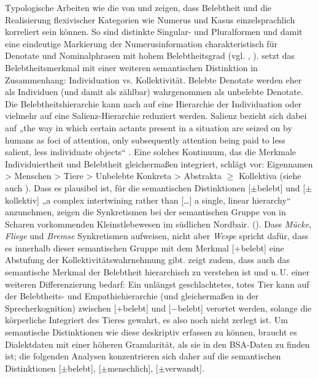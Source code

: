 Typologische Arbeiten wie die von \citet{Comrie1981} und \citet{Corbett2000} zeigen, dass Belebtheit und die Realisierung flexivischer Kategorien wie Numerus und Kasus einzelsprachlich korreliert sein können. So sind distinkte Singular- und Pluralformen und damit eine eindeutige Markierung der Numerusinformation charakteristisch für Denotate und Nominalphrasen mit hohem Belebtheitsgrad (vgl. \citealt[180]{Comrie1981}, \citealt[56]{Corbett2000}). \citet[181--182]{Comrie1981} setzt das Belebtheitsmerkmal mit einer weiteren semantischen Distinktion in Zusammenhang: Individuation vs. Kollektivität. Belebte Denotate werden eher als Individuen (und damit als zählbar) wahrgenommen als unbelebte Denotate. Die Belebtheitshierarchie kann nach \citet[192]{Comrie1981} auf eine Hierarchie der Individuation oder vielmehr auf eine Salienz-Hierarchie reduziert werden. Salienz bezieht sich dabei auf „the way in which certain actants present in a situation are seized on by humans as foci of attention, only subsequently attention being paid to less salient, less individuate objects“ \citep[192]{Comrie1981}. Eine solches Kontinuum, das die Merkmale Individuiertheit und Belebtheit gleichermaßen integriert, schlägt \citet[180]{Sasse2015} vor: Eigennamen > Menschen > Tiere > Unbelebte Konkreta > Abstrakta ${\geq}$ Kollektiva (siehe auch \citealt[659]{Sasse1993}). Dass es plausibel ist, für die semantischen Distinktionen [${\pm}$belebt] und [${\pm}$kollektiv] „a complex intertwining rather than [\ldots] a single, linear hierarchy“ \citep[192]{Comrie1981} anzunehmen, zeigen die Synkretismen bei der semantischen Gruppe von in Scharen vorkommenden Kleinstlebewesen im südlichen Nordbair. (). Dass \textit{Mücke}, \textit{Fliege} und \textit{Bremse} Synkretismen aufweisen, nicht aber \textit{Wespe} spricht dafür, dass es innerhalb dieser semantischen Gruppe mit dem Merkmal [+belebt] eine Abstufung der Kollektivitätswahrnehmung gibt. \citet{Kasper2020} zeigt zudem, dass auch das semantische Merkmal der Belebtheit hierarchisch zu verstehen ist und u.\,U. einer weiteren Differenzierung bedarf: Ein unlängst geschlachtetes, totes Tier kann auf der Belebtheits- und Empathiehierarchie (und gleichermaßen in der Sprecherkognition) zwischen [+belebt] und [$-$belebt] verortet werden, solange die körperliche Integriert des Tieres gewahrt, es also noch nicht zerlegt ist. Um semantische Distinktionen wie diese deskriptiv erfassen zu können, braucht es Dialektdaten mit einer höheren Granularität, als sie in den BSA-Daten zu finden ist; die folgenden Analysen konzentrieren sich daher auf die semantischen Distinktionen [${\pm}$belebt], [${\pm}$menschlich], [${\pm}$verwandt].

